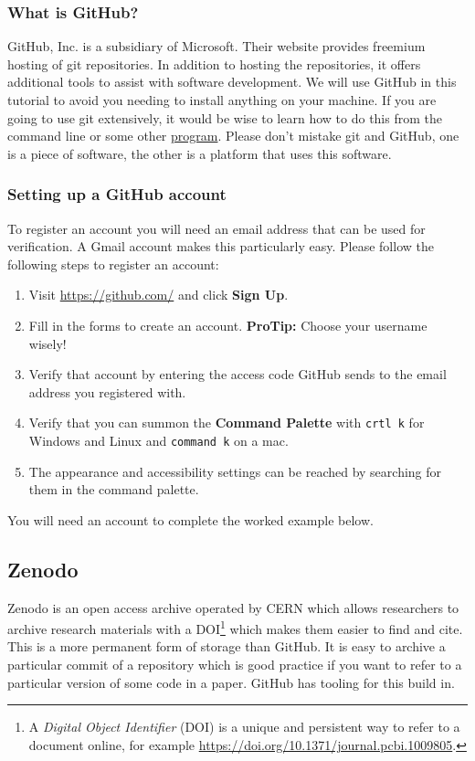 \documentclass[11pt,onecolumn]{scrartcl}
\begin{document}
\subsubsection*{What is GitHub?}
\label{sec:orgf108573}

GitHub, Inc. is a subsidiary of Microsoft. Their website provides freemium
hosting of git repositories. In addition to hosting the repositories, it offers
additional tools to assist with software development. We will use GitHub in this
tutorial to avoid you needing to install anything on your machine. If you are
going to use git extensively, it would be wise to learn how to do this from the
command line or some other \hyperref[sec:org8497bad]{program}. Please don't mistake git and GitHub, one is
a piece of software, the other is a platform that uses this software.

\subsubsection*{Setting up a GitHub account}
\label{sec:org04f462a}

To register an account you will need an email address that can be used for
verification. A Gmail account makes this particularly easy. Please follow the
following steps to register an account:

\begin{enumerate}
\item Visit \url{https://github.com/} and click \textbf{Sign Up}.
\item Fill in the forms to create an account. \textbf{ProTip:} Choose your username
wisely!
\item Verify that account by entering the access code GitHub sends to the email
address you registered with.
\item Verify that you can summon the \textbf{Command Palette} with \texttt{crtl k} for Windows
and Linux and \texttt{command k} on a mac.
\item The appearance and accessibility settings can be reached by searching for
them in the command palette.
\end{enumerate}

You will need an account to complete the worked example below.

\subsection{Zenodo}
\label{sec:org4458ae1}

Zenodo is an open access archive operated by CERN which allows researchers to
archive research materials with a DOI\footnote{A \emph{Digital Object Identifier} (DOI) is a unique and persistent way to refer to a document online, for example \url{https://doi.org/10.1371/journal.pcbi.1009805}.} which makes them easier to find and
cite. This is a more permanent form of storage than GitHub. It is easy to
archive a particular commit of a repository which is good practice if you want
to refer to a particular version of some code in a paper. GitHub has tooling for
this build in.
\end{document}
